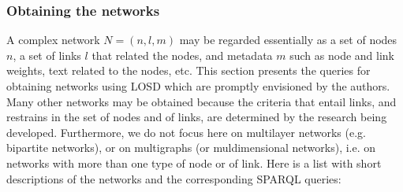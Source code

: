 \documentclass[review]{elsarticle}
\begin{document}
\subsubsection{Obtaining the networks}\label{snet}
A complex network $N=(n,l,m)$ may be regarded essentially as
a set of nodes $n$, a set of links $l$ that related the nodes,
and metadata $m$ such as node and link weights, text related to the nodes, etc.
This section presents the queries for obtaining networks using LOSD
which are promptly envisioned by the authors.
Many other networks may be obtained because the criteria that entail
links, and restrains in the set of nodes and of links,
are determined by the research being developed.
Furthermore, we do not focus here on multilayer networks (e.g. bipartite networks), or on multigraphs (or muldimensional networks), i.e. on networks with more than one type of node or of link.
Here is a list with short descriptions of the networks and the corresponding SPARQL queries:
\end{document}
